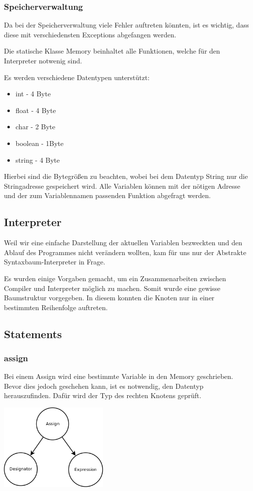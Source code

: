 \subsubsection{Speicherverwaltung}
Da bei der Speicherverwaltung viele Fehler auftreten könnten, ist es wichtig, dass diese mit verschiedensten Exceptions abgefangen werden.

Die statische Klasse Memory beinhaltet alle Funktionen, welche für den Interpreter notwenig sind.

Es werden verschiedene Datentypen unterstützt:
\begin{itemize}
 \item int - 4 Byte
 \item float - 4 Byte
 \item char - 2 Byte 
 \item boolean - 1Byte
 \item string - 4 Byte
\end{itemize}

Hierbei sind die Bytegrößen zu beachten, wobei bei dem Datentyp String nur die Stringadresse gespeichert wird. Alle Variablen können
mit der nötigen Adresse und der zum Variablennamen passenden Funktion abgefragt werden.

\subsection{Interpreter}
Weil wir eine einfache Darstellung der aktuellen Variablen bezweckten und den Ablauf des Programmes nicht verändern wollten, kam für 
uns nur der Abstrakte Syntaxbaum-Interpreter in Frage.

Es wurden einige Vorgaben gemacht, um ein Zusammenarbeiten zwischen Compiler und Interpreter möglich zu machen. Somit wurde eine gewisse
Baumstruktur vorgegeben. In diesem konnten die Knoten nur in einer bestimmten Reihenfolge auftreten.

\subsection{Statements}
\subsubsection{assign}
Bei einem Assign wird eine bestimmte Variable in den Memory geschrieben. Bevor dies jedoch geschehen kann, ist es notwendig,
den Datentyp herauszufinden. Dafür wird der Typ des rechten Knotens geprüft.

\includegraphics[width=0.4\textwidth]{./media/images/interpreter/syntaxbaum/statements/assign.png}

